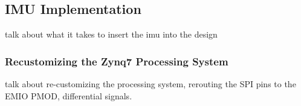 \subsection{IMU Implementation}
talk about what it takes to insert the imu into the design


\subsubsection{Recustomizing the Zynq7 Processing System}
talk about re-customizing the processing system, rerouting the SPI pins to the EMIO PMOD, differential signals.



